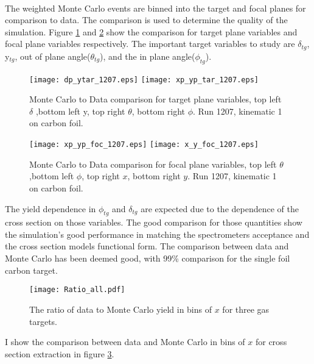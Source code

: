 \paragraph{}The weighted Monte Carlo events are binned into the target and focal planes for comparison to data. The comparison is used to determine the quality of the simulation. Figure \ref{tcomp} and \ref{fcomp} show the comparison for target plane variables and focal plane variables respectively. The important target variables to study are $\delta_{tg}$, y$_{tg}$, out of plane angle($\theta_{tg}$), and the in plane angle($\phi_{tg}$). 
\begin{figure}[t]
	\texttt{[image: dp\_ytar\_1207.eps]}
	\texttt{[image: xp\_yp\_tar\_1207.eps]}
	\caption{Monte Carlo to Data comparison for target plane variables, top left $\delta$ ,bottom left y, top right $\theta$, bottom right $\phi$. Run 1207, kinematic 1 on carbon foil.\label{tcomp}}

\end{figure}
\begin{figure}[t]
	{\centering
	\hspace{-10pt}
	\texttt{[image: xp\_yp\_foc\_1207.eps]}
	\texttt{[image: x\_y\_foc\_1207.eps]}}
	\caption{Monte Carlo to Data comparison for focal plane variables, top left $\theta$ ,bottom left $\phi$, top right $x$, bottom right $y$. Run 1207, kinematic 1 on carbon foil. \label{fcomp} }
\end{figure}
The yield dependence in $\phi_{tg}$ and $\delta_{tg}$ are expected due to the dependence of the cross section on those variables. The good comparison for those quantities show the simulation's good performance in matching the spectrometers acceptance and the cross section models functional form. The comparison between data and Monte Carlo has been deemed good, with 99\% comparison for the single foil carbon target. 
\begin{figure}
	\texttt{[image: Ratio\_all.pdf]}
		\caption{The ratio of data to Monte Carlo yield in bins of $x$ for three gas targets.\label{D_MC_COMP}}
\end{figure}
I show the comparison between data and Monte Carlo in bins of $x$ for cross section extraction in figure \ref{D_MC_COMP}.
